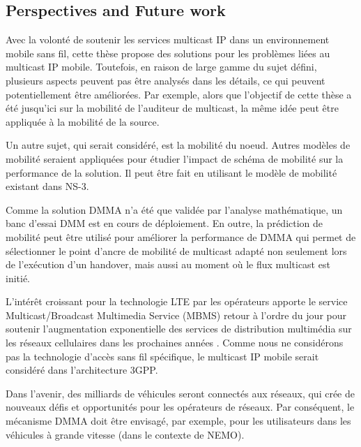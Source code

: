 \subsection{Perspectives and Future work}
Avec la volonté de soutenir les services multicast IP dans un environnement mobile sans fil, cette thèse propose des solutions pour les problèmes liées au multicast IP mobile. Toutefois, en raison de large gamme du sujet défini, plusieurs aspects peuvent pas être analysés dans les détails, ce qui peuvent potentiellement être améliorées. Par exemple, alors que l'objectif de cette thèse a été jusqu'ici sur la mobilité de l'auditeur de multicast, la même idée peut être appliquée à la mobilité de la source. 


Un autre sujet, qui serait considéré, est la mobilité du noeud. Autres modèles de mobilité seraient appliquées pour étudier l'impact de schéma de mobilité sur la performance de la solution. Il peut être fait en utilisant le modèle de mobilité existant dans NS-3.

Comme la solution DMMA n'a été que validée par l'analyse mathématique, un banc d'essai DMM est en cours de déploiement. En outre, la prédiction de mobilité peut être utilisé pour améliorer la performance de DMMA qui permet de sélectionner le point d'ancre de mobilité de multicast adapté non seulement lors de l'exécution d'un handover, mais aussi au moment où le flux multicast est initié.

L'intérêt croissant pour la technologie LTE par les opérateurs apporte le service Multicast/Broadcast Multimedia Service (MBMS) retour à l'ordre du jour pour soutenir l'augmentation exponentielle des services de distribution multimédia sur les réseaux cellulaires dans les prochaines années . Comme nous ne considérons pas la technologie d'accès sans fil spécifique, le multicast IP mobile serait considéré dans l'architecture 3GPP.
 
 
Dans l'avenir, des milliards de véhicules seront connectés aux réseaux, qui crée de nouveaux défis et opportunités pour les opérateurs de réseaux. Par conséquent, le mécanisme DMMA doit être envisagé, par exemple, pour les utilisateurs dans les véhicules à grande vitesse (dans le contexte de NEMO).


